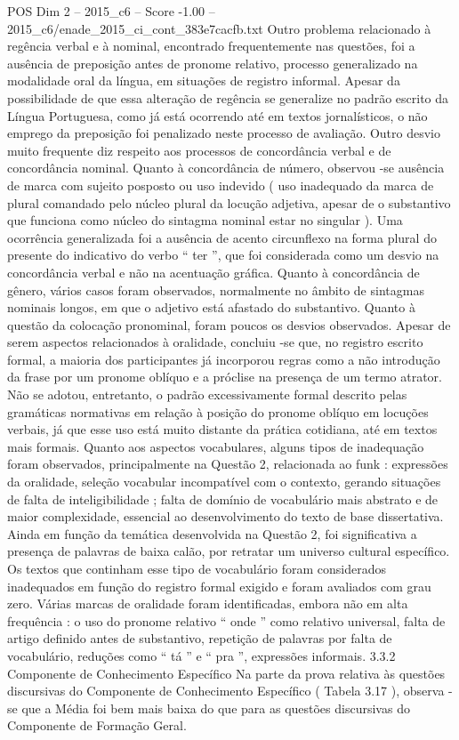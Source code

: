\begin{textsample}{POS Dim 2 – 2015\_c6 – Score -1.00 – 2015\_c6/enade\_2015\_ci\_cont\_383e7cacfb.txt}
Outro problema relacionado à regência verbal e à nominal, encontrado frequentemente nas questões, foi a ausência de preposição antes de pronome relativo, processo generalizado na modalidade oral da língua, em situações de registro informal.
Apesar da possibilidade de que essa alteração de regência se generalize no padrão escrito da Língua Portuguesa, como já está ocorrendo até em textos jornalísticos, o não emprego da preposição foi penalizado neste processo de avaliação.
Outro desvio muito frequente diz respeito aos processos de concordância verbal e de concordância nominal.
Quanto à concordância de número, observou -se ausência de marca com sujeito posposto ou uso indevido ( uso inadequado da marca de plural comandado pelo núcleo plural da locução adjetiva, apesar de o substantivo que funciona como núcleo do sintagma nominal estar no singular ).
Uma ocorrência generalizada foi a ausência de acento circunflexo na forma plural do presente do indicativo do verbo “ ter ”, que foi considerada como um desvio na concordância verbal e não na acentuação gráfica.
Quanto à concordância de gênero, vários casos foram observados, normalmente no âmbito de sintagmas nominais longos, em que o adjetivo está afastado do substantivo.
Quanto à questão da colocação pronominal, foram poucos os desvios observados.
Apesar de serem aspectos relacionados à oralidade, concluiu -se que, no registro escrito formal, a maioria dos participantes já incorporou regras como a não introdução da frase por um pronome oblíquo e a próclise na presença de um termo atrator.
Não se adotou, entretanto, o padrão excessivamente formal descrito pelas gramáticas normativas em relação à posição do pronome oblíquo em locuções verbais, já que esse uso está muito distante da prática cotidiana, até em textos mais formais.
Quanto aos aspectos vocabulares, alguns tipos de inadequação foram observados, principalmente na Questão 2, relacionada ao funk : expressões da oralidade, seleção vocabular incompatível com o contexto, gerando situações de falta de inteligibilidade ; falta de domínio de vocabulário mais abstrato e de maior complexidade, essencial ao desenvolvimento do texto de base dissertativa.
Ainda em função da temática desenvolvida na Questão 2, foi significativa a presença de palavras de baixa calão, por retratar um universo cultural específico.
Os textos que continham esse tipo de vocabulário foram considerados inadequados em função do registro formal exigido e foram avaliados com grau zero.
Várias marcas de oralidade foram identificadas, embora não em alta frequência : o uso do pronome relativo “ onde ” como relativo universal, falta de artigo definido antes de substantivo, repetição de palavras por falta de vocabulário, reduções como “ tá ” e “ pra ”, expressões informais. 3.3.2 Componente de Conhecimento Específico Na parte da prova relativa às questões discursivas do Componente de Conhecimento Específico ( Tabela 3.17 ), observa -se que a Média foi bem mais baixa do que para as questões discursivas do Componente de Formação Geral.

\end{textsample}
